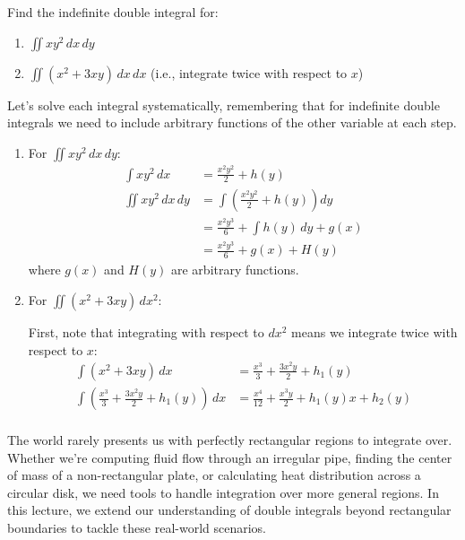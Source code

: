 \exampleline
\begin{example}
Find the indefinite double integral for:
\begin{enumerate}
   \item \(\displaystyle \iint xy^2 \,dx\,dy\)
   \item \(\displaystyle \iint (x^2 + 3xy) \,dx\,dx\) \quad (i.e., integrate twice with respect to \(x\))
\end{enumerate}

\begin{solution}
Let's solve each integral systematically, remembering that for indefinite double integrals we need to include arbitrary functions of the other variable at each step.

\begin{enumerate}
\item For \(\displaystyle \iint xy^2 \,dx\,dy\):
\begin{align*}
\int xy^2 \,dx &= \frac{x^2y^2}{2} + h(y) \\[1ex]
\iint xy^2 \,dx\,dy &= \int \left(\frac{x^2y^2}{2} + h(y)\right) dy \\[1ex]
&= \frac{x^2y^3}{6} + \int h(y)\,dy + g(x) \\[1ex]
&= \frac{x^2y^3}{6} + g(x) + H(y)
\end{align*}
where $g(x)$ and $H(y)$ are arbitrary functions.

\item For \(\displaystyle \iint (x^2 + 3xy) \,dx^2\):

First, note that integrating with respect to $dx^2$ means we integrate twice with respect to $x$:
\begin{align*}
\int (x^2 + 3xy) \,dx &= \frac{x^3}{3} + \frac{3x^2y}{2} + h_1(y) \\[1ex]
\int \left(\frac{x^3}{3} + \frac{3x^2y}{2} + h_1(y)\right) \,dx &= \frac{x^4}{12} + \frac{x^3y}{2} + h_1(y)x + h_2(y) \\[1ex]
\end{align*}
\end{enumerate}
\end{solution}
\end{example}
\exampleline





\newpage




 

\noindent The world rarely presents us with perfectly rectangular regions to integrate over. Whether we're computing fluid flow through an irregular pipe, finding the center of mass of a non-rectangular plate, or calculating heat distribution across a circular disk, we need tools to handle integration over more general regions. In this lecture, we extend our understanding of double integrals beyond rectangular boundaries to tackle these real-world scenarios.

